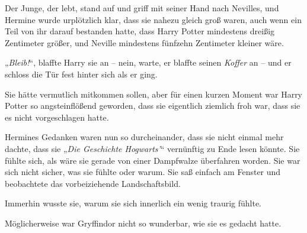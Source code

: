 Der Junge, der lebt, stand auf und griff mit seiner Hand nach Nevilles, und Hermine wurde urplötzlich klar, dass sie nahezu gleich groß waren, auch wenn ein Teil von ihr darauf bestanden hatte, dass Harry Potter mindestens dreißig Zentimeter größer, und Neville mindestens fünfzehn Zentimeter kleiner wäre. 

„\emph{Bleib!}“, blaffte Harry sie an – nein, warte, er blaffte seinen \emph{Koffer} an – und er schloss die Tür fest hinter sich als er ging. 

Sie hätte vermutlich mitkommen sollen, aber für einen kurzen Moment war Harry Potter so angsteinflößend geworden, dass sie eigentlich ziemlich froh war, dass sie es nicht vorgeschlagen hatte. 

Hermines Gedanken waren nun so durcheinander, dass sie nicht einmal mehr dachte, dass sie „\emph{Die Geschichte Hogwarts’}“ vernünftig zu Ende lesen könnte. Sie fühlte sich, als wäre sie gerade von einer Dampfwalze überfahren worden. Sie war sich nicht sicher, was sie fühlte oder warum. Sie saß einfach am Fenster und beobachtete das vorbeiziehende Landschaftsbild.

Immerhin wusste sie, warum sie sich innerlich ein wenig traurig fühlte.

Möglicherweise war Gryffindor nicht so wunderbar, wie sie es gedacht hatte.
